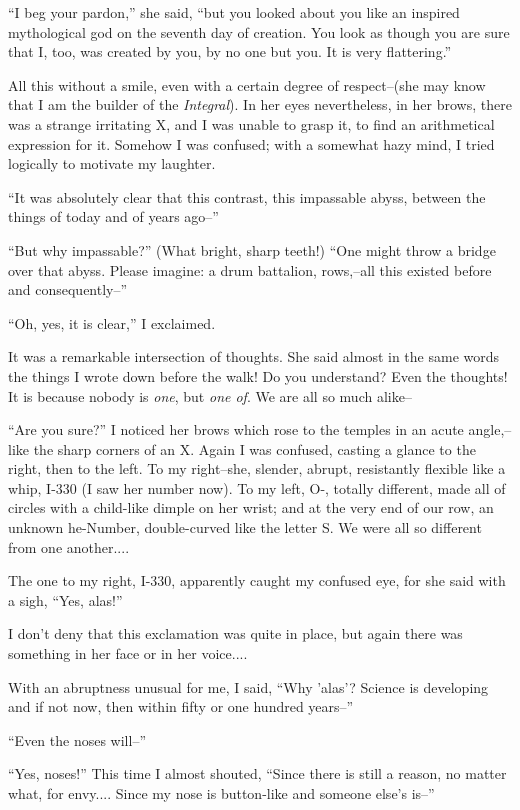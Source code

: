 \documentclass[11pt,openany]{book}
\begin{document}
``I beg your pardon,'' she said, ``but you looked about you like an inspired mythological god on the seventh day of creation. You look as though you are sure that I, too, was created by you, by no one but you. It is very flattering.''

All this without a smile, even with a certain degree of respect--(she may know that I am the builder of the \emph{Integral}). In her eyes nevertheless, in her brows, there was a strange irritating X, and I was unable to grasp it, to find an arithmetical expression for it. Somehow I was confused; with a somewhat hazy mind, I tried logically to motivate my laughter.

``It was absolutely clear that this contrast, this impassable abyss, between the things of today and of years ago--''

``But why impassable?'' (What bright, sharp teeth!) ``One might throw a bridge over that abyss. Please imagine: a drum battalion, rows,--all this existed before and consequently--''

``Oh, yes, it is clear,'' I exclaimed.

It was a remarkable intersection of thoughts. She said almost in the same words the things I wrote down before the walk! Do you understand? Even the thoughts! It is because nobody is \emph{one}, but \emph{one of}. We are all so much alike--

``Are you sure?'' I noticed her brows which rose to the temples in an acute angle,--like the sharp corners of an X. Again I was confused, casting a glance to the right, then to the left. To my right--she, slender, abrupt, resistantly flexible like a whip, I-330 (I saw her number now). To my left, O-, totally different, made all of circles with a child-like dimple on her wrist; and at the very end of our row, an unknown he-Number, double-curved like the letter S. We were all so different from one another....

The one to my right, I-330, apparently caught my confused eye, for she said with a sigh, ``Yes, alas!''

I don't deny that this exclamation was quite in place, but again there was something in her face or in her voice....

With an abruptness unusual for me, I said, ``Why 'alas'? Science is developing and if not now, then within fifty or one hundred years--''

``Even the noses will--''

``Yes, noses!'' This time I almost shouted, ``Since there is still a reason, no matter what, for envy.... Since my nose is button-like and someone else's is--''
\end{document}
